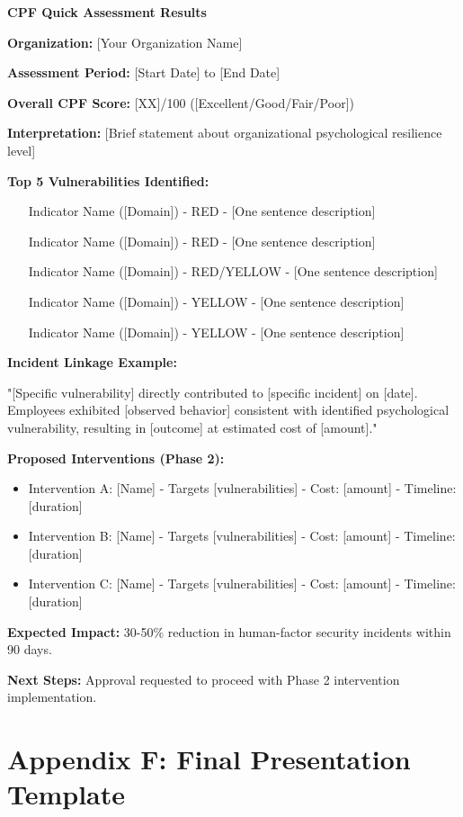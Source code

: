 \documentclass[11pt,a4paper]{article}
\begin{document}
\textbf{CPF Quick Assessment Results}

\textbf{Organization:} [Your Organization Name]

\textbf{Assessment Period:} [Start Date] to [End Date]

\textbf{Overall CPF Score:} [XX]/100 ([Excellent/Good/Fair/Poor])

\textbf{Interpretation:} [Brief statement about organizational psychological resilience level]

\textbf{Top 5 Vulnerabilities Identified:}
\begin{enumerate}
\item [Indicator Name] ([Domain]) - RED - [One sentence description]
\item [Indicator Name] ([Domain]) - RED - [One sentence description]
\item [Indicator Name] ([Domain]) - RED/YELLOW - [One sentence description]
\item [Indicator Name] ([Domain]) - YELLOW - [One sentence description]
\item [Indicator Name] ([Domain]) - YELLOW - [One sentence description]
\end{enumerate}

\textbf{Incident Linkage Example:}

"[Specific vulnerability] directly contributed to [specific incident] on [date]. Employees exhibited [observed behavior] consistent with identified psychological vulnerability, resulting in [outcome] at estimated cost of [amount]."

\textbf{Proposed Interventions (Phase 2):}
\begin{itemize}
\item Intervention A: [Name] - Targets [vulnerabilities] - Cost: [amount] - Timeline: [duration]
\item Intervention B: [Name] - Targets [vulnerabilities] - Cost: [amount] - Timeline: [duration]
\item Intervention C: [Name] - Targets [vulnerabilities] - Cost: [amount] - Timeline: [duration]
\end{itemize}

\textbf{Expected Impact:} 30-50\% reduction in human-factor security incidents within 90 days.

\textbf{Next Steps:} Approval requested to proceed with Phase 2 intervention implementation.

\section{Appendix F: Final Presentation Template}
\end{document}
